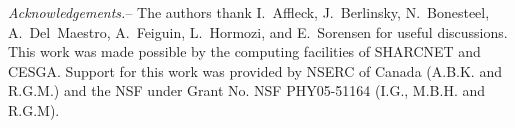 \documentclass[prl,aps,twocolumn,floatfix,amsmath,amssymb,superscriptaddress,tightenlines]{revtex4}
\begin{document}

{\it Acknowledgements.}-- The authors thank I.~Affleck, J.~Berlinsky,
N.~Bonesteel,
A.~Del~Maestro, A.~Feiguin, L.~Hormozi, and E.~Sorensen for useful
discussions.  This work was made possible by the computing facilities of
SHARCNET and CESGA.  Support for this work was provided by NSERC of
Canada (A.B.K. and R.G.M.) and the NSF under Grant No. NSF PHY05-51164 (I.G., M.B.H. and R.G.M).


\end{document}
